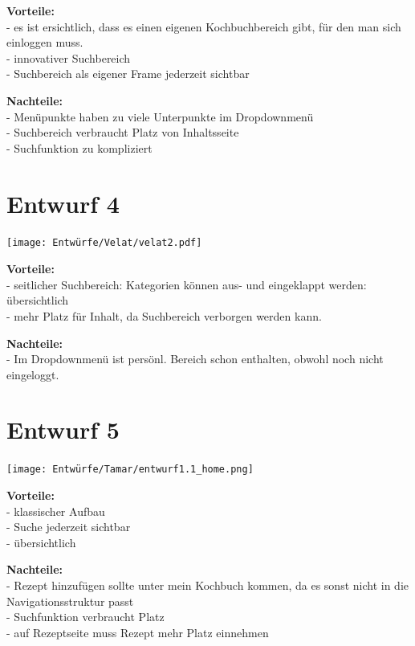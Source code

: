 \documentclass[parskip,10pt,abstracton]{scrartcl}
\begin{document}
\textbf{Vorteile:}\\
- es ist ersichtlich, dass es einen eigenen Kochbuchbereich gibt, für den man sich einloggen muss.\\
- innovativer Suchbereich\\
- Suchbereich als eigener Frame jederzeit sichtbar


\textbf{Nachteile:}\\
- Menüpunkte haben zu viele Unterpunkte im Dropdownmenü\\
- Suchbereich verbraucht Platz von Inhaltsseite\\
- Suchfunktion zu kompliziert

\section*{Entwurf 4} %

\texttt{[image: Entwürfe/Velat/velat2.pdf]}


\textbf{Vorteile:}\\
- seitlicher Suchbereich: Kategorien können aus- und eingeklappt werden: übersichtlich\\
- mehr Platz für Inhalt, da Suchbereich verborgen werden kann.

\textbf{Nachteile:}\\
- Im Dropdownmenü ist persönl. Bereich schon enthalten, obwohl noch nicht eingeloggt.

\newpage
\section*{Entwurf 5} %

\texttt{[image: Entwürfe/Tamar/entwurf1.1\_home.png]}



\textbf{Vorteile:}\\
- klassischer Aufbau\\
- Suche jederzeit sichtbar\\
- übersichtlich

\textbf{Nachteile:}\\
- Rezept hinzufügen sollte unter mein Kochbuch kommen, da es sonst nicht in die Navigationsstruktur passt\\
- Suchfunktion verbraucht Platz\\
- auf Rezeptseite muss Rezept mehr Platz einnehmen
\newpage
\end{document}
